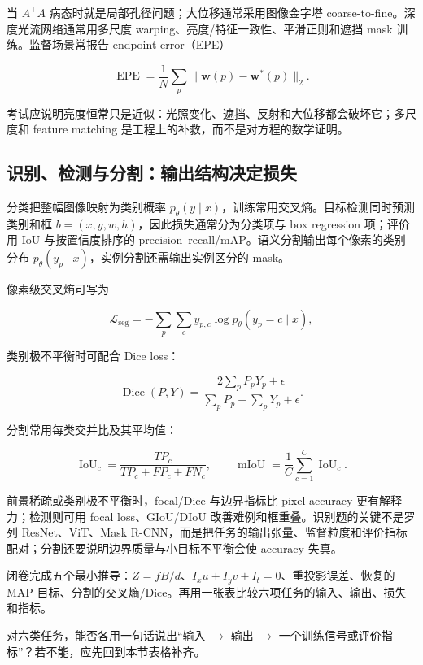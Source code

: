 当 \(A^\top A\) 病态时就是局部孔径问题；大位移通常采用图像金字塔 coarse-to-fine。深度光流网络通常用多尺度 warping、亮度/特征一致性、平滑正则和遮挡 mask 训练。监督场景常报告 endpoint error（EPE）

\[
  \operatorname{EPE}=\frac1N\sum_{p}\|\mathbf w(p)-\mathbf w^*(p)\|_2.
\]

考试应说明亮度恒常只是近似：光照变化、遮挡、反射和大位移都会破坏它；多尺度和 feature matching 是工程上的补救，而不是对方程的数学证明。

\subsection{识别、检测与分割：输出结构决定损失}

分类把整幅图像映射为类别概率 \(p_\theta(y\mid x)\)，训练常用交叉熵。目标检测同时预测类别和框 \(b=(x,y,w,h)\)，因此损失通常分为分类项与 box regression 项；评价用 IoU 与按置信度排序的 precision--recall/mAP。语义分割输出每个像素的类别分布 \(p_{\theta}(y_p\mid x)\)，实例分割还需输出实例区分的 mask。

像素级交叉熵可写为

\[
  \mathcal{L}_{\mathrm{seg}}
  =
  -\sum_{p}\sum_{c}y_{p,c}\log p_{\theta}(y_p=c\mid x),
\]

类别极不平衡时可配合 Dice loss：

\[
  \operatorname{Dice}(P,Y)
  =
  \frac{2\sum_pP_pY_p+\epsilon}{\sum_pP_p+\sum_pY_p+\epsilon}.
\]

分割常用每类交并比及其平均值：

\[
  \operatorname{IoU}_c
  =\frac{TP_c}{TP_c+FP_c+FN_c},
  \qquad
  \operatorname{mIoU}=\frac1C\sum_{c=1}^{C}\operatorname{IoU}_c.
\]

前景稀疏或类别极不平衡时，focal/Dice 与边界指标比 pixel accuracy 更有解释力；检测则可用 focal loss、GIoU/DIoU 改善难例和框重叠。识别题的关键不是罗列 ResNet、ViT、Mask R-CNN，而是把任务的输出张量、监督粒度和评价指标配对；分割还要说明边界质量与小目标不平衡会使 accuracy 失真。

\begin{checkpoint}[视觉单元闭卷验收]
闭卷完成五个最小推导：\(Z=fB/d\)、\(I_xu+I_yv+I_t=0\)、重投影误差、恢复的 MAP 目标、分割的交叉熵/Dice。再用一张表比较六项任务的输入、输出、损失和指标。
\end{checkpoint}

\begin{checkpoint}[视觉任务自检]
对六类任务，能否各用一句话说出“输入 \(\to\) 输出 \(\to\) 一个训练信号或评价指标”？若不能，应先回到本节表格补齐。
\end{checkpoint}

